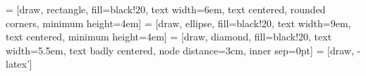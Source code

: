 % 
%

 = [draw, rectangle, fill=black!20, text width=6em, text centered, rounded corners, minimum height=4em]
 = [draw, ellipse, fill=black!20, text width=9em, text centered, minimum height=4em]
 = [draw, diamond, fill=black!20, text width=5.5em, text badly centered, node distance=3cm, inner sep=0pt]
 = [draw, -latex']